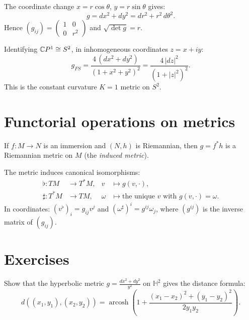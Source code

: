\begin{example}
The coordinate change $x = r\cos\theta$, $y = r\sin\theta$ gives:
\[
    g = dx^2 + dy^2 = dr^2 + r^2\, d\theta^2.
\]
Hence $(g_{ij}) = \begin{pmatrix} 1 & 0 \\ 0 & r^2 \end{pmatrix}$ and
$\sqrt{\det g} = r$.
\end{example}

\begin{example}
Identifying $\mathbb{C} P^1 \cong S^2$, in inhomogeneous coordinates $z = x + iy$:
\[
    g_{FS} = \frac{4\,(dx^2 + dy^2)}{(1 + x^2 + y^2)^2}
    = \frac{4\, |dz|^2}{(1 + |z|^2)^2}.
\]
This is the constant curvature $K = 1$ metric on $S^2$.
\end{example}

\section{Functorial operations on metrics}

\begin{proposition}
If $f : M \to N$ is an immersion and $(N, h)$ is Riemannian, then
$g = f^* h$ is a Riemannian metric on $M$ (the \emph{induced metric}).
\end{proposition}

\begin{proposition}
The metric induces canonical isomorphisms:
\begin{align*}
    \flat : TM &\to T^*M, & v &\mapsto g(v, \cdot), \\
    \sharp : T^*M &\to TM, & \omega &\mapsto \text{the unique } v \text{ with }
    g(v, \cdot) = \omega.
\end{align*}
In coordinates: $(v^\flat)_i = g_{ij} v^j$ and $(\omega^\sharp)^i = g^{ij} \omega_j$,
where $(g^{ij})$ is the inverse matrix of $(g_{ij})$.
\end{proposition}

\section{Exercises}

\begin{exercise}
Show that the hyperbolic metric $g = \frac{dx^2 + dy^2}{y^2}$ on $\mathbb{H}^2$
gives the distance formula:
\[
    d((x_1, y_1), (x_2, y_2))
    = \operatorname{arcosh}\!\left(1 + \frac{(x_1-x_2)^2 + (y_1-y_2)^2}{2 y_1 y_2}\right).
\]
\end{exercise}

